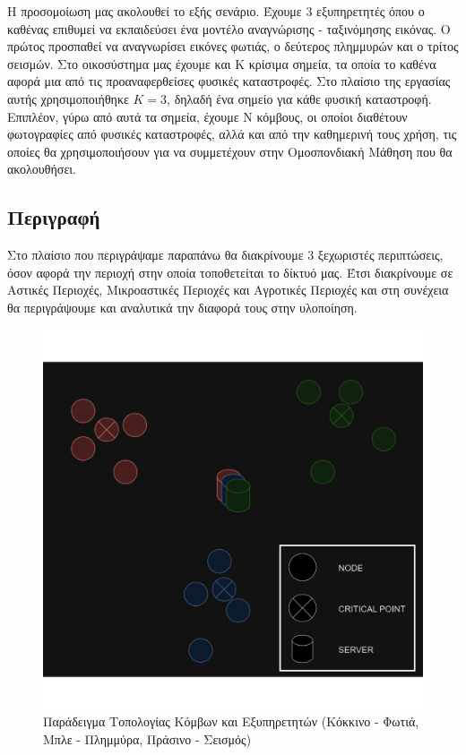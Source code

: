 Η προσομοίωση μας ακολουθεί το εξής σενάριο. Έχουμε 3 εξυπηρετητές όπου ο καθένας επιθυμεί να εκπαιδεύσει ένα μοντέλο αναγνώρισης - ταξινόμησης εικόνας. Ο πρώτος προσπαθεί να αναγνωρίσει εικόνες φωτιάς, ο δεύτερος πλημμυρών και ο τρίτος σεισμών. Στο οικοσύστημα μας έχουμε και Κ κρίσιμα σημεία, τα οποία το καθένα αφορά μια από τις προαναφερθείσες φυσικές καταστροφές. Στο πλαίσιο της εργασίας αυτής χρησιμοποιήθηκε $K=3$, δηλαδή ένα σημείο για κάθε φυσική καταστροφή. Επιπλέον, γύρω από αυτά τα σημεία, έχουμε Ν κόμβους, οι οποίοι διαθέτουν φωτογραφίες από φυσικές καταστροφές, αλλά και από την καθημερινή τους χρήση, τις οποίες θα χρησιμοποιήσουν για να συμμετέχουν στην Ομοσπονδιακή Μάθηση που θα ακολουθήσει.

\subsection{Περιγραφή}

Στο πλαίσιο που περιγράψαμε παραπάνω θα διακρίνουμε 3 ξεχωριστές περιπτώσεις, όσον αφορά την περιοχή στην οποία τοποθετείται το δίκτυό μας. Έτσι διακρίνουμε σε Αστικές Περιοχές, Μικροαστικές Περιοχές και Αγροτικές Περιοχές και στη συνέχεια θα περιγράψουμε και αναλυτικά την διαφορά τους στην υλοποίηση. 

\begin{figure}[ht]
    \centering
    \includegraphics[width=\textwidth]{figures/chapter2/topology+ypomn.png}
    \vspace{-1cm}
    \caption{Παράδειγμα Τοπολογίας Κόμβων και Εξυπηρετητών (Κόκκινο - Φωτιά, Μπλε - Πλημμύρα, Πράσινο - Σεισμός)}
    \label{fig46}
\end{figure}

